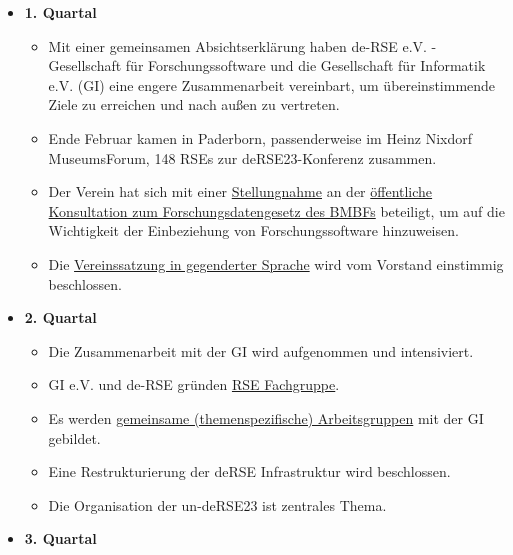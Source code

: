 \begin{itemize}
 \item \textbf{1. Quartal}
   \begin{itemize}
     \item Mit einer gemeinsamen Absichtserklärung haben de-RSE e.V. - Gesellschaft für Forschungssoftware und die Gesellschaft für Informatik e.V. (GI) eine engere Zusammenarbeit vereinbart, um übereinstimmende Ziele zu erreichen und nach außen zu vertreten.
     \item Ende Februar kamen in Paderborn, passenderweise im Heinz Nixdorf MuseumsForum, 148 RSEs zur deRSE23-Konferenz zusammen.
     \item Der Verein hat sich mit einer \href{https://github.com/DE-RSE/Rueckmeldung_Konsultation_Forschungsdatengesetz/blob/master/Abgabe/R%C3%BCckmeldung_deRSE_eV.pdf}{Stellungnahme} an der \href{https://www.bmbf.de/SharedDocs/Downloads/de/2023/230306-forschungsdatengesetz-Einladungsschreiben.pdf?__blob=publicationFile&v=1}{öffentliche Konsultation zum Forschungsdatengesetz des BMBFs} beteiligt, um auf die Wichtigkeit der Einbeziehung von Forschungssoftware hinzuweisen.
     \item Die \href{https://github.com/DE-RSE/satzung/blob/40d49ffa9550cdbcbfb3b20284fc829c40cf41d0/de-RSE-e.V._Satzung.md}{Vereinssatzung in gegenderter Sprache} wird vom Vorstand einstimmig beschlossen. 

   \end{itemize}\clearpage
 \item \textbf{2. Quartal}
   \begin{itemize}
    \item Die Zusammenarbeit mit der GI wird aufgenommen und intensiviert.
    \item GI e.V. und de-RSE gründen \href{https://de-rse.org/blog/2023/07/18/RSE-Fachgruppe-de.html}{RSE Fachgruppe}.
    \item Es werden \href{https://fg-rse.gi.de/fachgruppe/arbeitskreise}{gemeinsame (themenspezifische) Arbeitsgruppen} mit der GI gebildet.
    \item Eine Restrukturierung der deRSE Infrastruktur wird beschlossen.
    \item Die Organisation der \dq un-deRSE23\dq{} ist zentrales Thema.

   \end{itemize}
 \item \textbf{3. Quartal}
   \begin{itemize}


\end{itemize}
\end{itemize}

